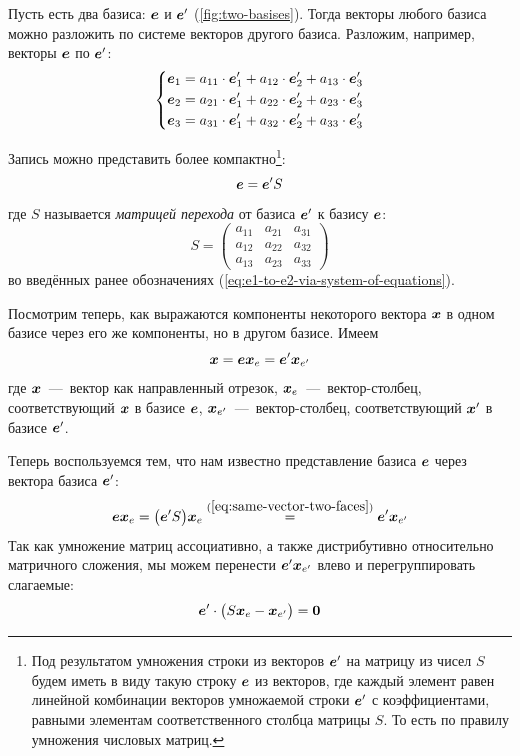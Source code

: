 \documentclass[a4paper,12pt]{article}
\begin{document}
  Пусть есть два базиса: $\boldsymbol e$ и $\boldsymbol e'$ (\ref{fig:two-basises}).
  Тогда векторы любого базиса можно разложить по системе векторов другого базиса.
  Разложим, например, векторы $\boldsymbol e$ по $\boldsymbol e'$:
  \begin{equation}\label{eq:e1-to-e2-via-system-of-equations}
    \left\{
      \begin{aligned}
        &\boldsymbol e_1 = a_{11} \cdot \boldsymbol e'_1 + a_{12} \cdot \boldsymbol e'_2 + a_{13} \cdot \boldsymbol e'_3\\
        &\boldsymbol e_2 = a_{21} \cdot \boldsymbol e'_1 + a_{22} \cdot \boldsymbol e'_2 + a_{23} \cdot \boldsymbol e'_3\\
        &\boldsymbol e_3 = a_{31} \cdot \boldsymbol e'_1 + a_{32} \cdot \boldsymbol e'_2 + a_{33} \cdot \boldsymbol e'_3
      \end{aligned}
    \right.
  \end{equation}
  
  Запись можно представить более компактно\footnote{Под результатом умножения строки из векторов $\boldsymbol e'$ на матрицу из чисел $S$ будем иметь в виду такую строку $\boldsymbol e$ из векторов, где каждый элемент равен линейной комбинации векторов умножаемой строки $\boldsymbol e'$ с коэффициентами, равными элементам соответственного столбца матрицы $S$. То есть по правилу умножения числовых матриц.}:
  \[
    \boldsymbol e = \boldsymbol e' S
  \]
  где $S$ называется \emph{матрицей перехода} от базиса $\boldsymbol e'$ к базису $\boldsymbol e$:
  \[
    S = \begin{pmatrix}
      a_{11} & a_{21} & a_{31}\\
      a_{12} & a_{22} & a_{32}\\
      a_{13} & a_{23} & a_{33}
    \end{pmatrix}
  \]
  во введённых ранее обозначениях (\ref{eq:e1-to-e2-via-system-of-equations}).
  
  Посмотрим теперь, как выражаются компоненты некоторого вектора $\boldsymbol x$ в одном базисе через его же компоненты, но в другом базисе.
  Имеем
  \begin{equation}\label{eq:same-vector-two-faces}
    \boldsymbol x = \boldsymbol e \boldsymbol x_e = \boldsymbol e' \boldsymbol x_{e'}
  \end{equation}
  где $\boldsymbol x$~---~вектор как направленный отрезок,
  $\boldsymbol x_e$~---~вектор-столбец, соответствующий $\boldsymbol x$ в базисе $\boldsymbol e$,
  $\boldsymbol x_{e'}$~---~вектор-столбец, соответствующий $\boldsymbol x'$ в базисе $\boldsymbol e'$.
  
  Теперь воспользуемся тем, что нам известно представление базиса $\boldsymbol e$ через вектора базиса $\boldsymbol e'$:
  \[
    \boldsymbol e \boldsymbol x_e = \bigl(\boldsymbol e' S\bigr) \boldsymbol x_e
      \stackrel{(\ref{eq:same-vector-two-faces})}{=} \boldsymbol e' \boldsymbol x_{e'}
  \]
  Так как умножение матриц ассоциативно, а также дистрибутивно относительно матричного сложения, мы можем перенести $\boldsymbol e' \boldsymbol x_{e'}$ влево и перегруппировать слагаемые:
  \[
    \boldsymbol e' \cdot \bigl(S \boldsymbol x_e - \boldsymbol x_{e'}\bigr) = \boldsymbol 0
  \]
  
\end{document}
